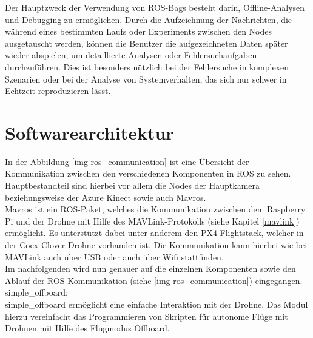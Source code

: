 \begin{description}
    Der Hauptzweck der Verwendung von ROS-Bags besteht darin, Offline-Analysen und Debugging zu ermöglichen. Durch die Aufzeichnung der Nachrichten, die während eines bestimmten Laufs oder Experiments zwischen den Nodes ausgetauscht werden, können die Benutzer die aufgezeichneten Daten später wieder abspielen, um detaillierte Analysen oder Fehlersuchaufgaben durchzuführen. Dies ist besonders nützlich bei der Fehlersuche in komplexen Szenarien oder bei der Analyse von Systemverhalten, das sich nur schwer in Echtzeit reproduzieren lässt.
\end{description}

\section{Softwarearchitektur} \label{softwarearchitektur:section}

In der Abbildung \ref{img ros_communication} ist eine Übersicht der Kommunikation zwischen den verschiedenen Komponenten in \ac{ROS} zu sehen. \\
Hauptbestandteil sind hierbei vor allem die Nodes der Hauptkamera beziehungsweise der Azure Kinect sowie auch Mavros. \\
Mavros ist ein ROS-Paket, welches die Kommunikation zwischen dem Raspberry Pi und der Drohne mit Hilfe des MAVLink-Protokolls (siehe Kapitel \ref{mavlink}) ermöglicht. Es unterstützt dabei unter anderem den PX4 Flightstack, welcher in der Coex Clover Drohne vorhanden ist. Die Kommunikation kann hierbei wie bei MAVLink auch über \ac{USB} oder auch über Wifi stattfinden. \cite[vgl.][]{mavros}\\
Im nachfolgenden wird nun genauer auf die einzelnen Komponenten sowie den Ablauf der ROS Kommunikation (siehe \ref{img ros_communication}) eingegangen. \\

simple\_offboard: \\
simple\_offboard ermöglicht eine einfache Interaktion mit der Drohne. Das Modul hierzu vereinfacht das Programmieren von Skripten für autonome Flüge mit Drohnen mit Hilfe des Flugmodus Offboard. \cite[vgl.][]{simple_offboard}\\

